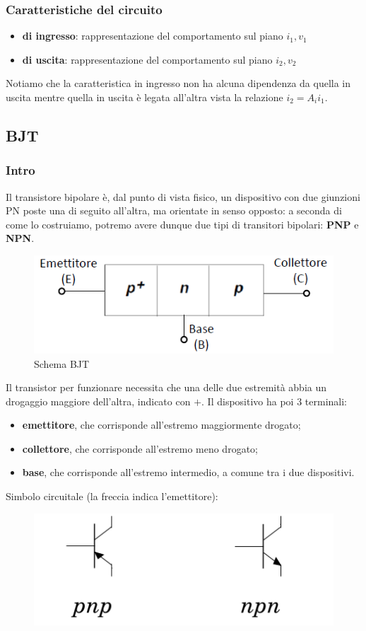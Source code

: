 \documentclass[11pt,a4paper,]{article}
\begin{document}
\subsubsection{Caratteristiche del circuito}
\begin{itemize}
    \item \textbf{di ingresso}: rappresentazione del comportamento sul piano $i_1, v_1$
    \item \textbf{di uscita}: rappresentazione del comportamento sul piano $i_2, v_2$
\end{itemize}
Notiamo che la caratteristica in ingresso non ha alcuna dipendenza da quella in uscita mentre quella in uscita è legata all'altra vista la relazione $i_2=A_ii_1$.

\subsection{BJT}
\subsubsection{Intro}
Il transistore bipolare è, dal punto di vista fisico, un dispositivo con due giunzioni PN poste una di seguito all'altra, ma orientate in senso opposto: a seconda di come lo costruiamo, potremo avere dunque due tipi di transitori bipolari: \textbf{PNP} e \textbf{NPN}.
\begin{figure}[H]
    \centering
    \includegraphics[width=0.5\linewidth]{img/schema bjt.png}
    \caption{Schema BJT}
\end{figure}
Il transistor per funzionare necessita che una delle due estremità abbia un drogaggio maggiore dell'altra, indicato con $+$.
Il dispositivo ha poi 3 terminali:
\begin{itemize}
    \item \textbf{emettitore}, che corrisponde all'estremo maggiormente drogato;
    \item \textbf{collettore}, che corrisponde all'estremo meno drogato;
    \item \textbf{base}, che corrisponde all'estremo intermedio, a comune tra i due dispositivi.
\end{itemize}
Simbolo circuitale (la freccia indica l'emettitore):
\begin{figure}[H]
    \centering
    \includegraphics[width=0.5\linewidth]{img/trans.png}
\end{figure}
\end{document}
